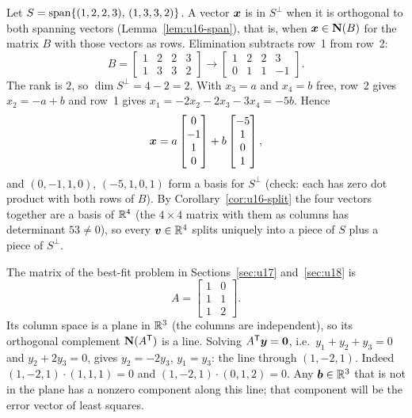 \begin{example}\label{ex:u16-sperp}
Let $S=\operatorname{span}\{(1,2,2,3),\,(1,3,3,2)\}$. A vector $\boldsymbol{x}$ is in $S^{\perp}$ when it is
orthogonal to both spanning vectors (Lemma~\ref{lem:u16-span}), that is, when
$\boldsymbol{x}\in\mathbf{N}(B)$ for the matrix $B$ with those vectors as rows. Elimination subtracts row~1
from row~2:
\[
  B=\begin{bmatrix}1&2&2&3\\1&3&3&2\end{bmatrix}\longrightarrow
  \begin{bmatrix}1&2&2&3\\0&1&1&-1\end{bmatrix}.
\]
The rank is $2$, so $\dim S^{\perp}=4-2=2$. With $x_3=a$ and $x_4=b$ free, row~2 gives
$x_2=-a+b$ and row~1 gives $x_1=-2x_2-2x_3-3x_4=-5b$. Hence
\[
  \boldsymbol{x}=a\begin{bmatrix}0\\-1\\1\\0\end{bmatrix}+b\begin{bmatrix}-5\\1\\0\\1\end{bmatrix},
\]
and $(0,-1,1,0)$, $(-5,1,0,1)$ form a basis for $S^{\perp}$ (check: each has zero dot product
with both rows of $B$). By Corollary~\ref{cor:u16-split} the four vectors together are a basis
of $\mathbb{R}^4$ (the $4\times 4$ matrix with them as columns has determinant $53\neq 0$), so every
$\boldsymbol{v}\in\mathbb{R}^4$ splits uniquely into a piece of $S$ plus a piece of $S^{\perp}$.
\end{example}

\begin{example}\label{ex:u16-short}
The matrix of the best-fit problem in Sections~\ref{sec:u17} and~\ref{sec:u18} is
\[
  A=\begin{bmatrix}1&0\\1&1\\1&2\end{bmatrix}.
\]
Its column space is a plane in $\mathbb{R}^3$ (the columns are independent), so its orthogonal
complement $\mathbf{N}(A^{\mathsf{T}})$ is a line. Solving $A^{\mathsf{T}}\boldsymbol{y}=\boldsymbol{0}$, i.e.\ $y_1+y_2+y_3=0$ and
$y_2+2y_3=0$, gives $y_2=-2y_3$, $y_1=y_3$: the line through $(1,-2,1)$. Indeed
$(1,-2,1)\cdot(1,1,1)=0$ and $(1,-2,1)\cdot(0,1,2)=0$. Any $\boldsymbol{b}\in\mathbb{R}^3$ that is not in the
plane has a nonzero component along this line; that component will be the error vector
of least squares.
\end{example}

